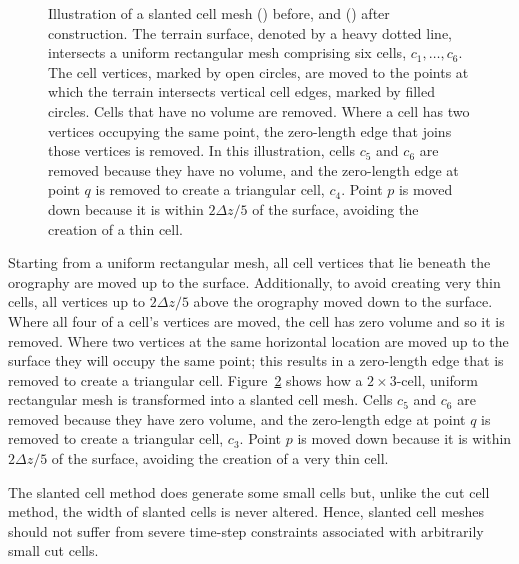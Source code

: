 \begin{figure}
\centering
\begin{subfigure}{\textwidth}
	\centering
	
	\label{fig:slanted:construct-mesh:before}
	\label{fig:slanted:construct-mesh:after}
\end{subfigure}
\caption{Illustration of a slanted cell mesh
() before, and
() after construction.
	The terrain surface, denoted by a heavy dotted line, intersects a uniform rectangular mesh comprising six cells, $c_1, \ldots, c_6$.
	The cell vertices, marked by open circles, are moved to the points at which the terrain intersects vertical cell edges, marked by filled circles.  Cells that have no volume are removed.  Where a cell has two vertices occupying the same point, the zero-length edge that joins those vertices is removed.
	In this illustration, cells $c_5$ and $c_6$ are removed because they have no volume, and the zero-length edge at point $q$ is removed to create a triangular cell, $c_4$.
	Point $p$ is moved down because it is within $2 \Delta z/5$ of the surface, avoiding the creation of a thin cell.}
\label{fig:slanted:construct-mesh}
\end{figure}

Starting from a uniform rectangular mesh, all cell vertices that lie beneath the orography are moved up to the surface.
Additionally, to avoid creating very thin cells, all vertices up to $2 \Delta z/5$ above the orography  moved down to the surface.
Where all four of a cell's vertices are moved, the cell has zero volume and so it is removed.  Where two vertices at the same horizontal location are moved up to the surface they will occupy the same point; this results in a zero-length edge that is removed to create a triangular cell.
Figure~\ref{fig:slanted:construct-mesh} shows how a $2 \times 3$-cell, uniform rectangular mesh is transformed into a slanted cell mesh.  Cells $c_5$ and $c_6$ are removed because they have zero volume, and the zero-length edge at point $q$ is removed to create a triangular cell, $c_3$.
Point $p$ is moved down because it is within $2\Delta z/5$ of the surface, avoiding the creation of a very thin cell.

The slanted cell method does generate some small cells but, unlike the cut cell method, the width of slanted cells is never altered.  Hence, slanted cell meshes should not suffer from severe time-step constraints associated with arbitrarily small cut cells.
